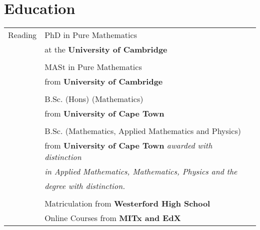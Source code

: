 
\section{Education}

\begin{tabular}{R{2.5cm}|ll}
  Reading   & PhD in Pure Mathematics                                                            & \\
            & \tableindent at the \textbf{University of Cambridge}                               & \\
            &                                                                                    & \\

    & MASt in Pure Mathematics                                                           & \\
            & \tableindent from \textbf{University of Cambridge}                                 & \\
            &                                                                                    & \\

    & B.Sc. (Hons) (Mathematics)                                                         & \\
            & \tableindent from \textbf{University of Cape Town}                                 & \\
            &                                                                                    & \\

    & B.Sc. (Mathematics, Applied Mathematics and Physics)                               & \\
            & \tableindent from \textbf{University of Cape Town} \emph{awarded with distinction} & \\
            & \tableindent \emph{in Applied Mathematics, Mathematics, Physics and the}           & \\
            & \tableindent \emph{degree with distinction. }                                      & \\
            &                                                                                    & \\

    & Matriculation from \textbf{Westerford High School}                                 & \\
            & Online Courses from \textbf{MITx and EdX}                                          & \\
\end{tabular}

